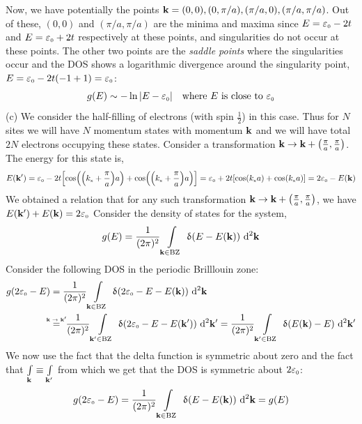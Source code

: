 \documentclass[usenames, svgnames, dvipsnames]{scrartcl}
\newcommand{\tund}[1]{_{\text{\tiny #1}}}
\newcommand{\tvec}[1]{\vb{{#1}}}
\newcommand{\tvp}{\tvec{p}}
\newcommand{\myeq}[1]{\mathrel{\stackrel{\makebox[0pt]{\mbox{\normalfont\tiny #1}}}{=}}}\newcommand{\omp}{\omega_{\tvp}}
\begin{document}
Now, we have potentially the points $\vb{k} = (0,0), (0,\pi/a), (\pi/a,0), (\pi/a,\pi/a)$. Out of these, $(0,0)$ and $(\pi/a,\pi/a)$ are the minima and maxima since $E = \varepsilon\tund{0}-2t$ and $E = \varepsilon\tund{0}+2t$ respectively at these points, and singularities do not occur at these points. The other two points are the \textit{saddle points} where the singularities occur and the DOS shows a logarithmic divergence around the singularity point, $E = \varepsilon\tund{0} - 2t(-1 +1) = \varepsilon\tund{0}$:
$$g(E)\sim -\ln|E-\varepsilon\tund{0}| \quad \text{where } E\text{ is close to $\varepsilon\tund{0}$}$$
(c) We consider the half-filling of electrons (with spin $\frac{1}{2}$) in this case. Thus for $N$ sites we will have $N$ momentum states with momentum $\vb{k}$ and we will have total $2N$ electrons occupying these states. Consider a transformation $\vb{k}\to \vb{k} + \qty(\frac{\pi}{a}, \frac{\pi}{a})$. The energy for this state is, 
$$E(\vb{k}') = \varepsilon\tund{0} -2t \qty[\cos(\qty(k\tund{x}+\frac{\pi}{a})a)+\cos(\qty(k\tund{x}+\frac{\pi}{a})a)]= \varepsilon\tund{0} +2t \qty[\cos(k\tund{x}a)+\cos(k\tund{x}a)] = 2\varepsilon\tund{0}-E(\vb{k})$$
We obtained a relation that for any such transformation $\vb{k}\to \vb{k} + \qty(\frac{\pi}{a}, \frac{\pi}{a})$, we have $E(\vb{k}') + E(\vb{k}) = 2\varepsilon\tund{0}$
Consider the density of states for the system, 
\begin{align*}
    g(E) = \frac{1}{(2\pi)^2}\int\limits_{\vb{k}\in \text{BZ}}\ \updelta(E-E(\vb{k})) \ \dd^2\vb{k}
\end{align*}
Consider the following DOS in the periodic Brilllouin zone:
\begin{align*}
    g(2\varepsilon\tund{0}-E) &=  \frac{1}{(2\pi)^2}\int\limits_{\vb{k}\in \text{BZ}}\ \updelta(2\varepsilon\tund{0}-E-E(\vb{k})) \ \dd^2\vb{k}\\
    &\myeq{$\vb{k}\to \vb{k}'$}\  \frac{1}{(2\pi)^2}\int\limits_{\vb{k}'\in \text{BZ}}\ \updelta(2\varepsilon\tund{0}-E-E(\vb{k}')) \ \dd^2\vb{k}'=   \frac{1}{(2\pi)^2}\int\limits_{\vb{k}'\in \text{BZ}}\ \updelta(E(\vb{k})-E ) \ \dd^2\vb{k}'
\end{align*}
We now use the fact that the delta function is symmetric about zero and the fact that $\int\limits_{\vb{k}} \equiv \int\limits_{\vb{k}'}$ from which we get that the DOS is symmetric about $2\varepsilon\tund{0}$:
$$g(2\varepsilon\tund{0}-E) =  \frac{1}{(2\pi)^2}\int\limits_{\vb{k}\in \text{BZ}}\ \updelta(E-E(\vb{k}) ) \ \dd^2\vb{k} = g(E)$$ 
\end{document}
